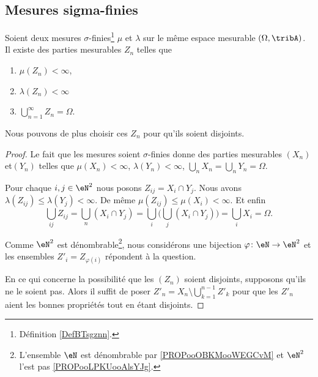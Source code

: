 \subsection{Mesures sigma-finies}

\begin{lemma}		\label{LEMooXOPMooMmIbmD}
	Soient deux mesures \( \sigma\)-finies\footnote{Définition \ref{DefBTsgznn}.} \( \mu\) et \( \lambda\) sur le même espace mesurable \( (\Omega,\tribA)\). Il existe des parties mesurables \( Z_n\) telles que
	\begin{enumerate}
		\item
		      \( \mu(Z_n)<\infty\),
		\item
		      \( \lambda(Z_n)<\infty\)
		\item
		      \( \bigcup_{n=1}^{\infty}Z_n=\Omega\).
	\end{enumerate}
	Nous pouvons de plus choisir ces \( Z_n\) pour qu'ils soient disjoints.
\end{lemma}

\begin{proof}
	Le fait que les mesures soient \( \sigma\)-finies donne des parties mesurables \( (X_n)\) et\( (Y_n)\) telles que \( \mu(X_n)<\infty\), \( \lambda(Y_n)<\infty\), \( \bigcup_nX_n=\bigcup_nY_n=\Omega\).

	Pour chaque \( i,j\in \eN^2\) nous posons \( Z_{ij}=X_i\cap Y_j\). Nous avons \( \lambda(Z_{ij})\leq \lambda(Y_j)<\infty\). De même \( \mu(Z_{ij})\leq \mu(X_i)<\infty\). Et enfin
	\begin{equation}
		\bigcup_{ij}Z_{ij}=\bigcup_n(X_i\cap Y_j)=\bigcup_i\Big( \bigcup_j(X_i\cap Y_j) \Big)=\bigcup_i X_i=\Omega.
	\end{equation}

	Comme \( \eN^2\) est dénombrable\footnote{L'ensemble \( \eN\) est dénombrable par \ref{PROPooOBKMooWEGCvM} et \( \eN^2\) l'est pas \ref{PROPooLPKUooAlsYJg}.}, nous considérons une bijection \(\varphi \colon \eN\to \eN^2  \) et les ensembles \( Z'_i=Z_{\varphi(i)}\) répondent à la question.

	En ce qui concerne la possibilité que les \( (Z_n)\) soient disjoints, supposons qu'ils ne le soient pas. Alors il suffit de poser \( Z'_n=X_n\setminus \bigcup_{k=1}^{n-1}Z'_k\) pour que les \( Z'_n\) aient les bonnes propriétés tout en étant disjoints.
\end{proof}

